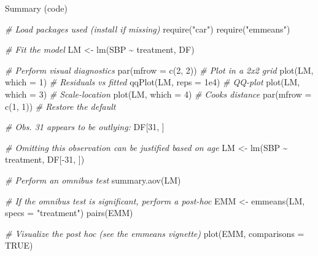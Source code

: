 \documentclass[
]{book}
\newenvironment{Shaded}{\begin{snugshade}}{\end{snugshade}}
\newcommand{\AttributeTok}[1]{\textcolor[rgb]{0.77,0.63,0.00}{#1}}
\newcommand{\CommentTok}[1]{\textcolor[rgb]{0.56,0.35,0.01}{\textit{#1}}}
\newcommand{\ConstantTok}[1]{\textcolor[rgb]{0.00,0.00,0.00}{#1}}
\newcommand{\DecValTok}[1]{\textcolor[rgb]{0.00,0.00,0.81}{#1}}
\newcommand{\FloatTok}[1]{\textcolor[rgb]{0.00,0.00,0.81}{#1}}
\newcommand{\FunctionTok}[1]{\textcolor[rgb]{0.00,0.00,0.00}{#1}}
\newcommand{\NormalTok}[1]{#1}
\newcommand{\OtherTok}[1]{\textcolor[rgb]{0.56,0.35,0.01}{#1}}
\newcommand{\SpecialCharTok}[1]{\textcolor[rgb]{0.00,0.00,0.00}{#1}}
\newcommand{\StringTok}[1]{\textcolor[rgb]{0.31,0.60,0.02}{#1}}
\begin{document}
Summary (code)

\begin{Shaded}
\begin{Highlighting}[]
\CommentTok{\# Load packages used (install if missing)}
\FunctionTok{require}\NormalTok{(}\StringTok{"car"}\NormalTok{)}
\FunctionTok{require}\NormalTok{(}\StringTok{"emmeans"}\NormalTok{)}

\CommentTok{\# Fit the model}
\NormalTok{LM }\OtherTok{\textless{}{-}} \FunctionTok{lm}\NormalTok{(SBP }\SpecialCharTok{\textasciitilde{}}\NormalTok{ treatment, DF)}

\CommentTok{\# Perform visual diagnostics}
\FunctionTok{par}\NormalTok{(}\AttributeTok{mfrow =} \FunctionTok{c}\NormalTok{(}\DecValTok{2}\NormalTok{, }\DecValTok{2}\NormalTok{))   }\CommentTok{\# Plot in a 2x2 grid}
\FunctionTok{plot}\NormalTok{(LM, }\AttributeTok{which =} \DecValTok{1}\NormalTok{)    }\CommentTok{\# Residuals vs fitted}
\FunctionTok{qqPlot}\NormalTok{(LM, }\AttributeTok{reps =} \FloatTok{1e4}\NormalTok{) }\CommentTok{\# QQ{-}plot}
\FunctionTok{plot}\NormalTok{(LM, }\AttributeTok{which =} \DecValTok{3}\NormalTok{)    }\CommentTok{\# Scale{-}location}
\FunctionTok{plot}\NormalTok{(LM, }\AttributeTok{which =} \DecValTok{4}\NormalTok{)    }\CommentTok{\# Cook\textquotesingle{}s distance}
\FunctionTok{par}\NormalTok{(}\AttributeTok{mfrow =} \FunctionTok{c}\NormalTok{(}\DecValTok{1}\NormalTok{, }\DecValTok{1}\NormalTok{))   }\CommentTok{\# Restore the default}

\CommentTok{\# Obs. 31 appears to be outlying:}
\NormalTok{DF[}\DecValTok{31}\NormalTok{, ]}

\CommentTok{\# Omitting this observation can be justified based on age}
\NormalTok{LM }\OtherTok{\textless{}{-}} \FunctionTok{lm}\NormalTok{(SBP }\SpecialCharTok{\textasciitilde{}}\NormalTok{ treatment, DF[}\SpecialCharTok{{-}}\DecValTok{31}\NormalTok{, ])}

\CommentTok{\# Perform an omnibus test}
\FunctionTok{summary.aov}\NormalTok{(LM)}

\CommentTok{\# If the omnibus test is significant, perform a post{-}hoc}
\NormalTok{EMM }\OtherTok{\textless{}{-}} \FunctionTok{emmeans}\NormalTok{(LM, }\AttributeTok{specs =} \StringTok{"treatment"}\NormalTok{)}
\FunctionTok{pairs}\NormalTok{(EMM)}

\CommentTok{\# Visualize the post hoc (see the emmeans vignette)}
\FunctionTok{plot}\NormalTok{(EMM, }\AttributeTok{comparisons =} \ConstantTok{TRUE}\NormalTok{)}
\end{Highlighting}
\end{Shaded}
\end{document}
